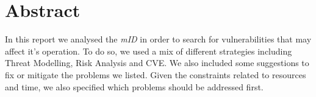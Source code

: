 \section{Abstract}

In this report we analysed the \emph{mID} in order to search for vulnerabilities that may affect it's operation. To do so, we used a mix of different strategies including Threat Modelling, Risk Analysis and CVE. We also included some suggestions to fix or mitigate the problems we listed. Given the constraints related to resources and time, we also specified which problems should be addressed first. 

\pagebreak